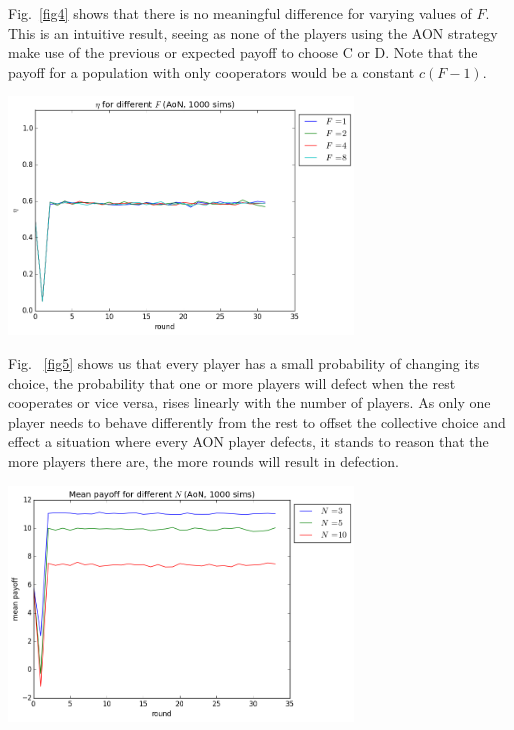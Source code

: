 \documentclass[letterpaper]{article}
\begin{document}
Fig.~\ref{fig4} shows that there is no meaningful difference for varying values of $F$. This is an intuitive result, seeing as none of the players using the AON strategy make use of the previous or expected payoff to choose C or D. Note that the payoff for a population with only cooperators would be a constant $c(F-1)$.


\vspace{5 mm}
\includegraphics[width=3.6in,angle=0]{img/cfraction_F_aon.png}
\label{fig4}
\vspace{5 mm}


Fig. ~\ref{fig5} shows us that every player has a small probability of changing its choice, the probability that one or more players will defect when the rest cooperates or vice versa, rises linearly with the number of players. As only one player needs to behave differently from the rest to offset the collective choice and effect a situation where every AON player defects, it stands to reason that the more players there are, the more rounds will result in defection.
\vspace{5 mm}


\includegraphics[width=3.6in,angle=0]{img/meanpayoff_N_aon.png}
\label{fig5}
\vspace{5 mm}
\end{document}
